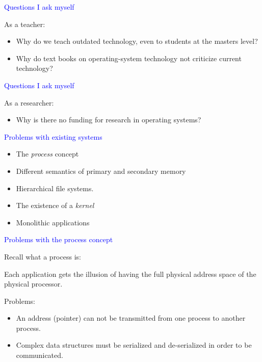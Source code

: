 \documentclass{slides}
\newcommand{\ti}[1]{\begin{center}\Large{\textcolor{blue}{#1}}\end{center}}
\begin{document}
\begin{slide}\ti{Questions I ask myself}
\vskip 0.5cm
As a teacher:

  \begin{itemize}
  \item Why do we teach outdated technology, even to students at the
    masters level?
  \item Why do text books on operating-system technology not criticize
    current technology?
  \end{itemize}

\vfill\end{slide}
\begin{slide}\ti{Questions I ask myself}
\vskip 0.5cm
As a researcher:

  \begin{itemize}
  \item Why is there no funding for research in operating systems?
  \end{itemize}

\vfill\end{slide}
\begin{slide}\ti{Problems with existing systems}
\vskip 0.5cm
\begin{itemize}
\item The \emph{process} concept
\item Different semantics of primary and secondary memory
\item Hierarchical file systems. 
\item The existence of a \emph{kernel}
\item Monolithic applications
\end{itemize}
\vfill\end{slide}
\begin{slide}\ti{Problems with the process concept}
\vskip 0.5cm
Recall what a process is:

Each application gets the illusion of having the full physical address
space of the physical processor.  

Problems:
\begin{itemize}
\item An address (pointer) can not be transmitted from one process to
  another process.
\item Complex data structures must be serialized and de-serialized in
  order to be communicated.
\end{itemize}
\vfill\end{slide}
\end{document}
